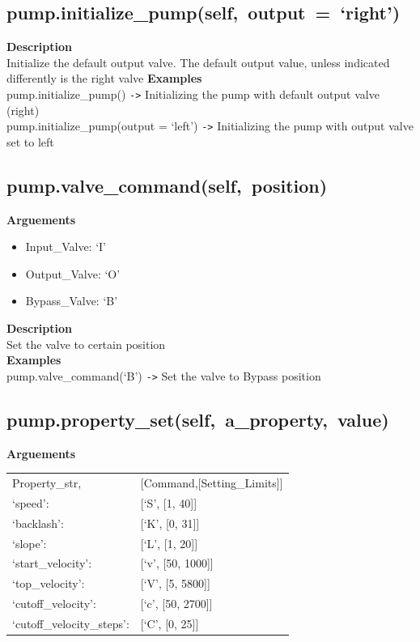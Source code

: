 \documentclass[a4paper]{article}
\begin{document}
\subsection{\mbox{pump.initialize\_pump(self, output = `right')}}
\textbf{Description}\\
Initialize the default output valve. The default output value,
unless indicated differently is the right valve
\textbf{Examples}\\
pump.initialize\_pump() \verb|->| Initializing the pump with default output valve (right)\\
pump.initialize\_pump(output = `left') \verb|->| Initializing the pump with output valve set to left\\

\subsection{\mbox{pump.valve\_command(self, position)}}
\textbf{Arguements}
\begin{itemize}
    \item Input\_Valve: `I'
    \item Output\_Valve: `O'
    \item Bypass\_Valve: `B'
\end{itemize}
\textbf{Description}\\
Set the valve to certain position\\
\textbf{Examples}\\
pump.valve\_command(`B') \verb|->| Set the valve to Bypass position

\subsection{\mbox{pump.property\_set(self, a\_property, value)}}
\textbf{Arguements}\\
\begin{tabular}{ll}
    Property\_str,& [Command,[Setting\_Limits]]\\
    `speed':& [`S', [1, 40]]\\
    `backlash':& [`K', [0, 31]]\\
    `slope':& [`L', [1, 20]]\\
    `start\_velocity':& [`v', [50, 1000]]\\
    `top\_velocity':& [`V', [5, 5800]]\\
    `cutoff\_velocity':& [`c', [50, 2700]]\\
    `cutoff\_velocity\_steps':& [`C', [0, 25]]\\
\end{tabular}
\end{document}
